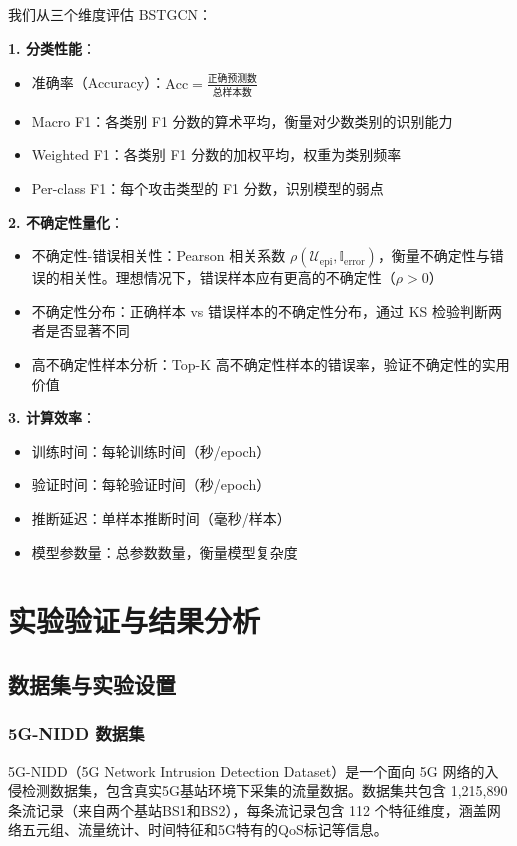 我们从三个维度评估 BSTGCN：

\textbf{1. 分类性能}：
\begin{itemize}
  \item 准确率（Accuracy）：$\text{Acc} = \frac{\text{正确预测数}}{\text{总样本数}}$
  \item Macro F1：各类别 F1 分数的算术平均，衡量对少数类别的识别能力
  \item Weighted F1：各类别 F1 分数的加权平均，权重为类别频率
  \item Per-class F1：每个攻击类型的 F1 分数，识别模型的弱点
\end{itemize}

\textbf{2. 不确定性量化}：
\begin{itemize}
  \item 不确定性-错误相关性：Pearson 相关系数 $\rho(\mathcal{U}_{\text{epi}}, \mathbb{I}_{\text{error}})$，衡量不确定性与错误的相关性。理想情况下，错误样本应有更高的不确定性（$\rho > 0$）
  \item 不确定性分布：正确样本 vs 错误样本的不确定性分布，通过 KS 检验判断两者是否显著不同
  \item 高不确定性样本分析：Top-K 高不确定性样本的错误率，验证不确定性的实用价值
\end{itemize}

\textbf{3. 计算效率}：
\begin{itemize}
  \item 训练时间：每轮训练时间（秒/epoch）
  \item 验证时间：每轮验证时间（秒/epoch）
  \item 推断延迟：单样本推断时间（毫秒/样本）
  \item 模型参数量：总参数数量，衡量模型复杂度
\end{itemize}

\section{实验验证与结果分析}

\subsection{数据集与实验设置}

\subsubsection{5G-NIDD 数据集}

5G-NIDD（5G Network Intrusion Detection Dataset）是一个面向 5G 网络的入侵检测数据集，包含真实5G基站环境下采集的流量数据。数据集共包含 1,215,890 条流记录（来自两个基站BS1和BS2），每条流记录包含 112 个特征维度，涵盖网络五元组、流量统计、时间特征和5G特有的QoS标记等信息。

